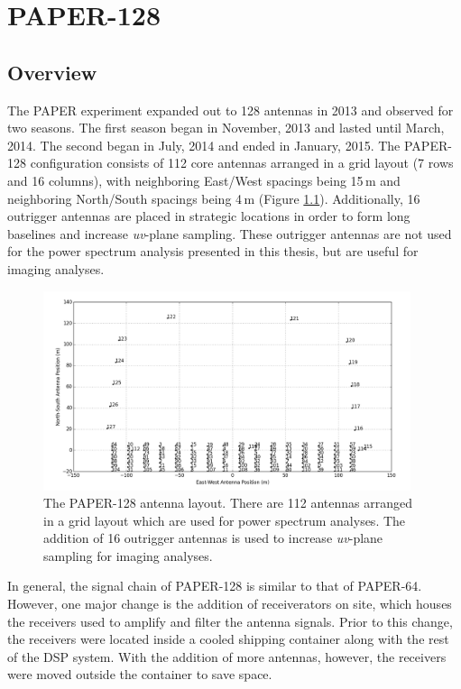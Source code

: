 \chapter{PAPER-128}
\label{c.PSA128}

\section{Overview}

The PAPER experiment expanded out to 128 antennas in 2013 and observed for two seasons. The first season began in November, 2013 and lasted until March, 2014. The second began in July, 2014 and ended in January, 2015. The PAPER-128 configuration consists of 112 core antennas arranged in a grid layout (7 rows and 16 columns), with neighboring East/West spacings being 15\,m and neighboring North/South spacings being 4\,m (Figure \ref{fig:paper128_array}). Additionally, 16 outrigger antennas are placed in strategic locations in order to form long baselines and increase \textit{uv}-plane sampling. These outrigger antennas are not used for the power spectrum analysis presented in this thesis, but are useful for imaging analyses.

\begin{figure}
	\centering
	\includegraphics[width=0.96\textwidth]{plots/paper128_layout.png}
	\caption{The PAPER-128 antenna layout. There are 112 antennas arranged in a grid layout which are used for power spectrum analyses. The addition of 16 outrigger antennas is used to increase \textit{uv}-plane sampling for imaging analyses.}
	\label{fig:paper128_array}
\end{figure}

In general, the signal chain of PAPER-128 is similar to that of PAPER-64. However, one major change is the addition of receiverators on site, which houses the receivers used to amplify and filter the antenna signals. Prior to this change, the receivers were located inside a cooled shipping container along with the rest of the DSP system. With the addition of more antennas, however, the receivers were moved outside the container to save space. 

